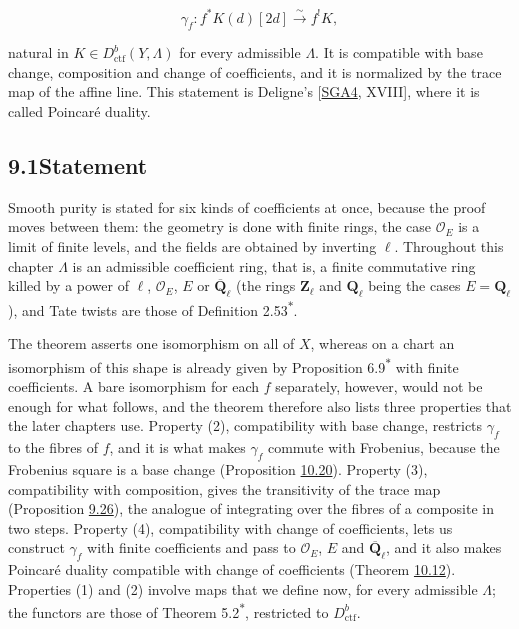 \documentclass[11pt]{article}
\newcommand{\bpout}[1]{#1\textsuperscript{\hyperlink{bp-outside}{\ensuremath{\ast}}}}
\begin{document}
\[
\gamma_f:f^*K(d)[2d]\xrightarrow{\sim}f^!K,
\]

natural in \(K\in D^b_{\mathrm{ctf}}(Y,\Lambda)\) for every admissible \(\Lambda\). It is compatible with base change, composition and change of coefficients, and it is normalized by the trace map of the affine line. This statement is Deligne's [\hyperref[bp330]{SGA4}, XVIII], where it is called Poincaré duality.

\subsection*{\texorpdfstring{9.1\quad Statement}{9.1 Statement}}
\label{bp5}%
\label{bp6}%
Smooth purity is stated for six kinds of coefficients at once, because the proof moves between them: the geometry is done with finite rings, the case \(\mathcal O_E\) is a limit of finite levels, and the fields are obtained by inverting \(\ell\). Throughout this chapter \(\Lambda\) is an admissible coefficient ring, that is, a finite commutative ring killed by a power of \(\ell\), \(\mathcal O_E\), \(E\) or \(\overline{\mathbf Q}_\ell\) (the rings \(\mathbf Z_\ell\) and \(\mathbf Q_\ell\) being the cases \(E=\mathbf Q_\ell\)), and Tate twists are those of Definition \bpout{2.53}.

The theorem asserts one isomorphism on all of \(X\), whereas on a chart an isomorphism of this shape is already given by Proposition \bpout{6.9} with finite coefficients. A bare isomorphism for each \(f\) separately, however, would not be enough for what follows, and the theorem therefore also lists three properties that the later chapters use. Property (2), compatibility with base change, restricts \(\gamma_f\) to the fibres of \(f\), and it is what makes \(\gamma_f\) commute with Frobenius, because the Frobenius square is a base change (Proposition \hyperref[bp162]{10.20}). Property (3), compatibility with composition, gives the transitivity of the trace map (Proposition \hyperref[bp88]{9.26}), the analogue of integrating over the fibres of a composite in two steps. Property (4), compatibility with change of coefficients, lets us construct \(\gamma_f\) with finite coefficients and pass to \(\mathcal O_E\), \(E\) and \(\overline{\mathbf Q}_\ell\), and it also makes Poincaré duality compatible with change of coefficients (Theorem \hyperref[bp137]{10.12}). Properties (1) and (2) involve maps that we define now, for every admissible \(\Lambda\); the functors are those of Theorem \bpout{5.2}, restricted to \(D^b_{\mathrm{ctf}}\).
\end{document}
